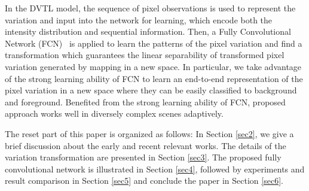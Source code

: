 \documentclass[journal]{IEEEtran}
\newcommand{\refsec}[1]{Section \ref{#1}}
\begin{document}
In the DVTL model, 
the sequence of pixel observations is used to represent the variation and input into the network for learning,
which encode both the intensity distribution and sequential information.
%
Then, a Fully Convolutional Network (FCN)\ \cite{Shelhamer2017fcn} is applied to learn the patterns of the pixel variation and find a transformation which guarantees the linear separability of transformed pixel variation generated by mapping in a new space.
%
In particular,
we take advantage of the strong learning ability of FCN to learn an end-to-end representation of the pixel variation in a new space where they can be easily classified to background and foreground.
%
Benefited from the strong learning ability of FCN,
proposed approach works well in diversely complex scenes adaptively.
%
% 
% 
% 
% 

The reset part of this paper is organized as follows: In \refsec{sec2}, we give a brief discussion about the early and recent relevant works. 
%
The details of the variation transformation are presented in \refsec{sec3}. The proposed fully convolutional network is illustrated in \refsec{sec4}, followed by experiments and result comparison in \refsec{sec5} and conclude the paper in \refsec{sec6}. 
\end{document}
